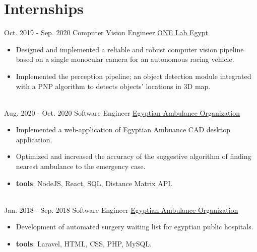 \documentclass[a4paper]{twentysecondcv} %
\begin{document}
\vspace{-0.25cm}

\section{Internships}{\faAlignJustify}

\begin{twenty} %

  \twentyitem
  {Oct. 2019 - Sep. 2020}
{}
    {Computer Vision Engineer}
    {\href{https://onelab-eg.com/}{ONE Lab Egypt}}
    {}
    {\vspace{-2mm}\begin{itemize}[topsep=0pt,partopsep=0pt]
    \item  Designed and implemented a reliable and robust computer vision pipeline based on a single monocular camera for an autonomous racing vehicle.
    \item  Implemented the perception pipeline; an object detection module integrated with a PNP algorithm to detects objects' locations in 3D map.
    \end{itemize}} \\

  \twentyitem
  {Aug. 2020 - Oct. 2020}
{}
    {Software Engineer}
    {\href{http://www.eao.gov.eg/English/Pages/default.aspx/}{Egyptian Ambulance Organization}}
    {}
    {\vspace{-2mm}\begin{itemize}[topsep=0pt,partopsep=0pt]
    \item Implemented a web-application of Egyptian Ambuance CAD desktop application.
    \item Optimized and increased the accuracy of the suggestive algorithm of finding nearest ambulance to the emergency case.
    \item \textbf{tools}: NodeJS, React, SQL, Distance Matrix API.
    \end{itemize}} \\

  \twentyitem
  {Jan. 2018 - Sep. 2018}
{}
    {Software Engineer}
    {\href{http://www.eao.gov.eg/English/Pages/default.aspx/}{Egyptian Ambulance Organization}}
    {}
    {\vspace{-2mm}\begin{itemize}[topsep=0pt,partopsep=0pt]
    \item Development of automated surgery waiting list for egyptian public hospitals.
    \item \textbf{tools}: Laravel, HTML, CSS, PHP, MySQL.
    \end{itemize}} \\


		

        
\end{twenty}
\end{document}
